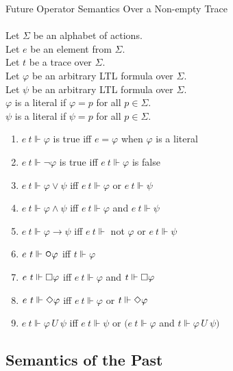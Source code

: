 \begin{definition}Future Operator Semantics Over a Non-empty Trace\\
\label{def:FutureNon-emptyTraceSemantics}
\\
Let $\Sigma$ be an alphabet of actions.\\
Let $e$ be an element from $\Sigma$.\\
Let $t$ be a trace over $\Sigma$.\\
Let $\varphi$ be an arbitrary LTL formula over $\Sigma$.\\
Let $\psi$ be an arbitrary LTL formula over $\Sigma$.\\
$\varphi$ is a literal if $\varphi = p$ for all $p \in \Sigma$.\\
$\psi$ is a literal if $\psi = p$ for all $p \in \Sigma$.

\begin{enumerate}[start = 10]
\item $e\ t  \Vdash \varphi$ is true iff $e = \varphi$ when $\varphi$ is a literal
\item $e\ t  \Vdash \neg\varphi$ is true iff $e\ t \Vdash \varphi$ is false
\item $e\ t  \Vdash \varphi \lor \psi$ iff $e\ t \Vdash \varphi$ or $e\ t \Vdash \psi$
\item $e\ t  \Vdash \varphi \land \psi$ iff $e\ t \Vdash \varphi$ and $e\ t \Vdash \psi$
\item $e\ t  \Vdash \varphi \rightarrow \psi$ iff $e\ t \Vdash $ not $\varphi$ or $e\ t \Vdash \psi$
\item $e\ t  \Vdash \LTLnext\varphi$ iff $t \Vdash \varphi$
\item $e\ t  \Vdash \square\varphi$ iff $e\ t \Vdash \varphi$ and $t \Vdash \square\varphi$
\item $e\ t  \Vdash \Diamond\varphi$ iff $e\ t \Vdash \varphi$ or $t \Vdash \Diamond\varphi$
\item $e\ t  \Vdash \varphi \,U\ \psi$ iff $e\ t \Vdash \psi$ or $(e\ t \Vdash \varphi$ and $t \Vdash \varphi \,U\ \psi)$
\end{enumerate}
\end{definition}

\subsection{Semantics of the Past}
\label{sec:LTLPastSemantics}

